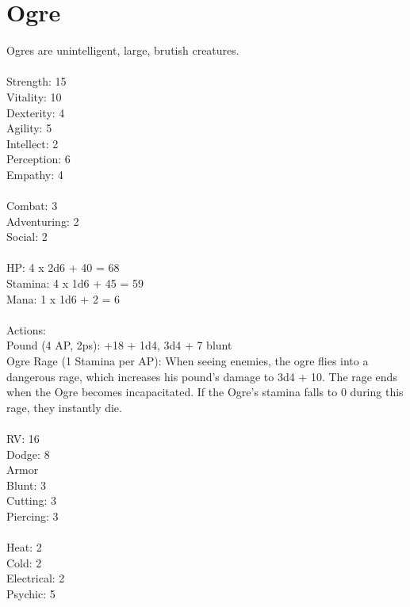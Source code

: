 \section{Ogre}

Ogres are unintelligent, large, brutish creatures.\\
\\
Strength: 15\\
Vitality: 10\\
Dexterity: 4\\
Agility: 5\\
Intellect: 2\\
Perception: 6\\
Empathy: 4\\
\\
Combat: 3\\
Adventuring: 2\\
Social: 2\\
\\
HP: 4 x 2d6 + 40 = 68\\
Stamina: 4 x 1d6 + 45 = 59\\
Mana: 1 x 1d6 + 2 = 6\\
\\
Actions:\\
Pound (4 AP, 2ps): +18 + 1d4, 3d4 + 7 blunt\\
Ogre Rage (1 Stamina per AP): When seeing enemies, the ogre flies into a dangerous rage, which increases his pound's damage to 3d4 + 10.
The rage ends when the Ogre becomes incapacitated.
If the Ogre's stamina falls to 0 during this rage, they instantly die.\\
\\
RV: 16\\
Dodge: 8\\
Armor\\
Blunt: 3\\
Cutting: 3\\
Piercing: 3\\
\\
Heat: 2\\
Cold: 2\\
Electrical: 2\\
Psychic: 5\\
